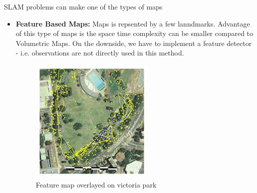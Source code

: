 \documentclass{article}
\begin{document}
SLAM problems can make one of the types of maps
\begin{itemize}
    \item \textbf{Feature Based Maps:} Maps is repsented by a few lanndmarks. Advantage of this type of maps is the space time complexity can be smaller compared to Volumetric Maps. On the downside, we have to implement a feature detector - i.e. observations are not directly used in this method. 
        \begin{figure}
            \includegraphics[width = \linewidth]{./feature_maps.jpeg}
            \caption{Feature map overlayed on victoria park}
        \end{figure}


\end{itemize}
\end{document}
